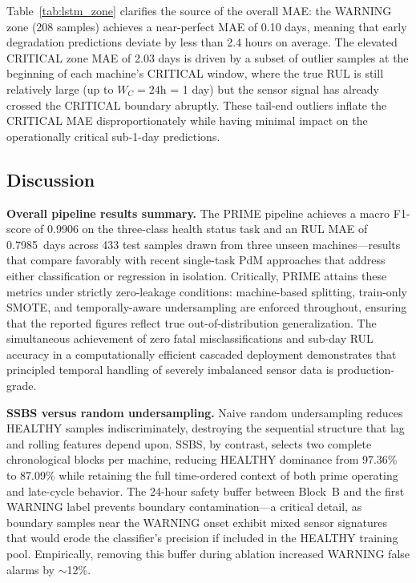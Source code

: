 \documentclass[conference]{IEEEtran}
\begin{document}
Table~\ref{tab:lstm_zone} clarifies the source of the overall MAE: the WARNING zone (208 samples) achieves a near-perfect MAE of 0.10 days, meaning that early degradation predictions deviate by less than 2.4 hours on average. The elevated CRITICAL zone MAE of 2.03 days is driven by a subset of outlier samples at the beginning of each machine's CRITICAL window, where the true RUL is still relatively large (up to $W_C=24$h = 1 day) but the sensor signal has already crossed the CRITICAL boundary abruptly. These tail-end outliers inflate the CRITICAL MAE disproportionately while having minimal impact on the operationally critical sub-1-day predictions.

\subsection{Discussion}

\textbf{Overall pipeline results summary.} The PRIME pipeline achieves a macro F1-score of 0.9906 on the three-class health status task and an RUL MAE of 0.7985~days across 433 test samples drawn from three unseen machines---results that compare favorably with recent single-task PdM approaches \cite{xu2026predictive, elkateb2024machine} that address either classification or regression in isolation. Critically, PRIME attains these metrics under strictly zero-leakage conditions: machine-based splitting, train-only SMOTE, and temporally-aware undersampling are enforced throughout, ensuring that the reported figures reflect true out-of-distribution generalization. The simultaneous achievement of zero fatal misclassifications and sub-day RUL accuracy in a computationally efficient cascaded deployment demonstrates that principled temporal handling of severely imbalanced sensor data is production-grade.

\textbf{SSBS versus random undersampling.} Naive random undersampling reduces HEALTHY samples indiscriminately, destroying the sequential structure that lag and rolling features depend upon. SSBS, by contrast, selects two complete chronological blocks per machine, reducing HEALTHY dominance from 97.36\% to 87.09\% while retaining the full time-ordered context of both prime operating and late-cycle behavior. The 24-hour safety buffer between Block~B and the first WARNING label prevents boundary contamination---a critical detail, as boundary samples near the WARNING onset exhibit mixed sensor signatures that would erode the classifier's precision if included in the HEALTHY training pool. Empirically, removing this buffer during ablation increased WARNING false alarms by $\sim$12\%.
\end{document}
